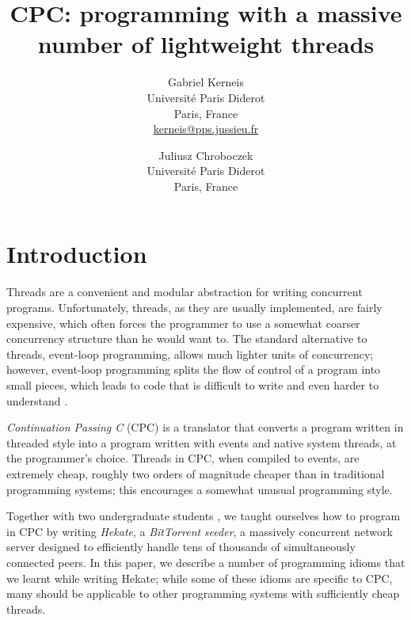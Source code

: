 \documentclass{easychair}
\begin{document}
\title{CPC: programming with a massive number of lightweight threads}




\author{Gabriel Kerneis\\
Universit\'e Paris Diderot\\
Paris, France\\
\url{kerneis@pps.jussieu.fr}\\
\and
Juliusz Chroboczek\\
Universit\'e Paris Diderot\\
Paris, France
}


\maketitle



\section{Introduction}

Threads are a convenient and modular abstraction for writing concurrent
programs.  Unfortunately, threads, as they are usually implemented, are
fairly expensive, which often forces the programmer to use a somewhat
coarser concurrency structure than he would want to.  The standard
alternative to threads, event-loop programming, allows much lighter units
of concurrency; however, event-loop programming splits the flow of control
of a program into small pieces, which leads to code that is difficult to
write and even harder to understand \cite{adya,behren}.

\emph{Continuation Passing C} (CPC) \cite{chroboczek,cpc2010} is a
translator that converts a program written in threaded style into a
program written with events and native system threads, at the
programmer's choice.  Threads in CPC, when compiled to events, are
extremely cheap, roughly two orders of magnitude cheaper than in
traditional programming systems; this encourages a somewhat unusual
programming style.

Together with two undergraduate students \cite{attar-canal}, we taught
ourselves how to program in CPC by writing \emph{Hekate},
a \emph{BitTorrent} \emph{seeder}, a massively concurrent network server
designed to efficiently handle tens of thousands of simultaneously
connected peers.  In this paper, we describe a number of programming
idioms that we learnt while writing Hekate; while some of these idioms
are specific to CPC, many should be applicable to other programming
systems with sufficiently cheap threads.
\end{document}
